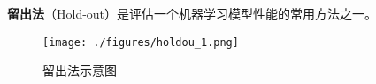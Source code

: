 
\textbf{留出法}（Hold-out）是评估一个机器学习模型性能的常用方法之一。



\begin{figure}[ht]
\centering
\texttt{[image: ./figures/holdou\_1.png]}
\caption{留出法示意图} \label{holdou_fig1}
\end{figure}